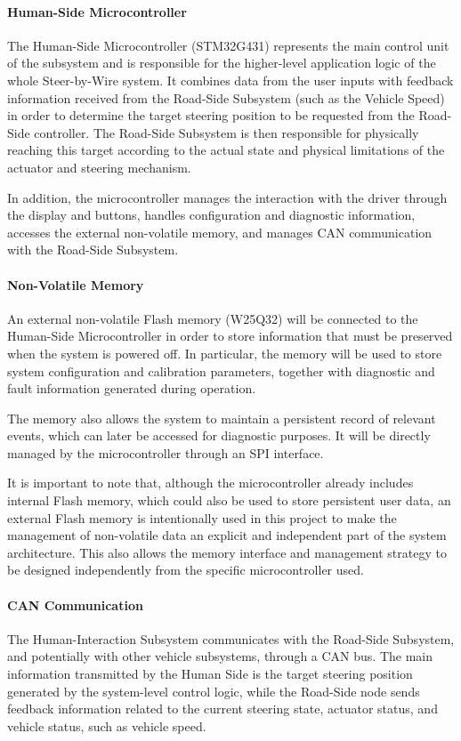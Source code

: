 \paragraph{Human-Side Microcontroller}
The Human-Side Microcontroller (STM32G431) represents the main control unit of the subsystem and is responsible for the higher-level application logic of the whole Steer-by-Wire system. It combines data from the user inputs with feedback information received from the Road-Side Subsystem (such as the Vehicle Speed) in order to determine the target steering position to be requested from the Road-Side controller. The Road-Side Subsystem is then responsible for physically reaching this target according to the actual state and physical limitations of the actuator and steering mechanism.

In addition, the microcontroller manages the interaction with the driver through the display and buttons, handles configuration and diagnostic information, accesses the external non-volatile memory, and manages CAN communication with the Road-Side Subsystem.


\paragraph{Non-Volatile Memory}
An external non-volatile Flash memory (W25Q32) will be connected to the Human-Side Microcontroller in order to store information that must be preserved when the system is powered off. In particular, the memory will be used to store system configuration and calibration parameters, together with diagnostic and fault information generated during operation.

The memory also allows the system to maintain a persistent record of relevant events, which can later be accessed for diagnostic purposes. It will be directly managed by the microcontroller through an SPI interface.

It is important to note that, although the microcontroller already includes internal Flash memory, which could also be used to store persistent user data, an external Flash memory is intentionally used in this project to make the management of non-volatile data an explicit and independent part of the system architecture. This also allows the memory interface and management strategy to be designed independently from the specific microcontroller used.


\paragraph{CAN Communication}
The Human-Interaction Subsystem communicates with the Road-Side Subsystem, and potentially with other vehicle subsystems, through a CAN bus. The main information transmitted by the Human Side is the target steering position generated by the system-level control logic, while the Road-Side node sends feedback information related to the current steering state, actuator status, and vehicle status, such as vehicle speed.

